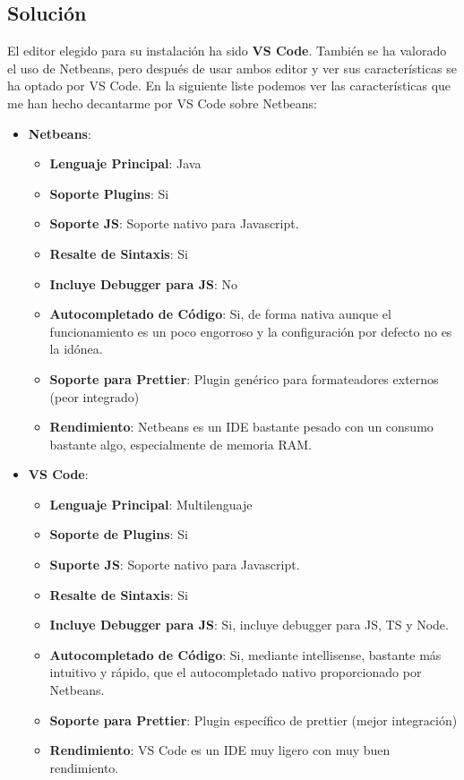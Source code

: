 \subsection{Solución}
El editor elegido para su instalación ha sido \textbf{VS Code}. También se ha valorado el uso de Netbeans, pero después de usar ambos editor y ver sus características se ha optado por VS Code. En la siguiente liste podemos ver las características que me han hecho decantarme por VS Code sobre Netbeans:

\begin{itemize}
    \item \textbf{Netbeans}:
           \begin{itemize}
               \item \textbf{Lenguaje Principal}: Java
               \item \textbf{Soporte Plugins}: Si
               \item \textbf{Soporte JS}: Soporte nativo para Javascript.
               \item \textbf{Resalte de Sintaxis}: Si
               \item \textbf{Incluye Debugger para JS}: No
               \item \textbf{Autocompletado de Código}: Si, de forma nativa aunque el funcionamiento es un poco engorroso y la configuración por defecto no es la idónea.
               \item \textbf{Soporte para Prettier}: Plugin genérico para formateadores externos (peor integrado)
               \item \textbf{Rendimiento}: Netbeans es un IDE bastante pesado con un consumo bastante algo, especialmente de memoria RAM.
           \end{itemize}

    \item \textbf{VS Code}:
          \begin{itemize}
              \item \textbf{Lenguaje Principal}: Multilenguaje
              \item \textbf{Soporte de Plugins}: Si
              \item \textbf{Suporte JS}: Soporte nativo para Javascript.
              \item \textbf{Resalte de Sintaxis}: Si
              \item \textbf{Incluye Debugger para JS}: Si, incluye debugger para JS, TS y Node.
              \item \textbf{Autocompletado de Código}: Si, mediante intellisense, bastante más intuitivo y rápido, que el autocompletado nativo proporcionado por Netbeans.
              \item \textbf{Soporte para Prettier}: Plugin específico de prettier (mejor integración)
              \item \textbf{Rendimiento}: VS Code es un IDE muy ligero con muy buen rendimiento.
          \end{itemize}
\end{itemize}

